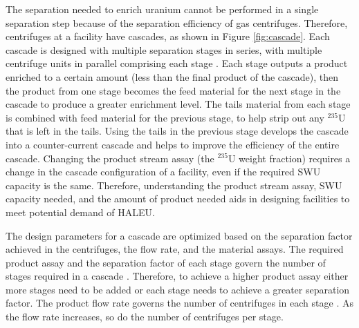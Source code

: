 The separation needed to enrich uranium cannot be performed 
in a single 
separation step because of the separation efficiency of gas centrifuges. 
Therefore, centrifuges at a facility have  
cascades, as shown in Figure \ref{fig:cascade}. Each cascade is designed with 
multiple separation stages in series, with multiple centrifuge units in 
parallel comprising each stage \cite{villani_uranium_1979}. Each stage 
outputs a product enriched to a certain amount (less than the final product 
of the cascade), then the product from one 
stage becomes the feed material for the next stage in the cascade to produce 
a greater enrichment level. The tails material from each 
stage is combined with feed material for the previous stage, to help strip 
out any $^{235}$U that is left in the tails. Using the tails in the 
previous stage develops the cascade into a counter-current cascade 
\cite{villani_uranium_1979} and helps to improve the efficiency of the entire cascade. 
Changing the product stream assay (the $^{235}$U weight fraction)
requires a change in the cascade configuration of 
a facility, even if the required \gls{SWU} capacity is the same. Therefore, 
understanding the product stream assay, \gls{SWU} capacity needed, and the 
amount of product needed aids in designing facilities to meet potential 
demand of \gls{HALEU}.



The design parameters for a cascade are optimized based on the separation 
factor 
achieved in the centrifuges, the flow rate, and the material assays. 
The required product assay and the separation factor of each stage govern 
the number of stages required in a cascade \cite{whitaker_uranium_2019}. 
Therefore, to achieve a higher product assay either more stages 
need to be added or each stage needs to achieve a greater separation
factor. The product flow rate governs the number of centrifuges in 
each stage \cite{whitaker_uranium_2019}. As the flow rate increases, 
so do the number of centrifuges per stage. 


%
%
%
